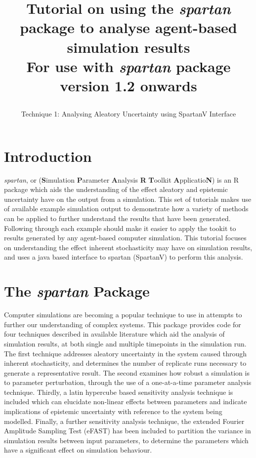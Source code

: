 \documentclass[a4paper,11pt]{article}
\title{\huge \textbf{Tutorial on using the \textit{spartan} package to analyse agent-based simulation results}\\
\Large For use with \textit{spartan} package version 1.2 onwards
\author{\Large Technique 1: Analysing Aleatory Uncertainty using SpartanV Interface}
\date{}
}
\begin{document}
\maketitle


\section{Introduction}
\noindent \textit{spartan}, or (\textbf{S}imulation \textbf{P}arameter \textbf{A}nalysis \textbf{R} \textbf{T}oolkit \textbf{A}pplicatio\textbf{N}) is an R package which aids the understanding of the effect aleatory and epistemic uncertainty have on the output from a simulation.  This set of tutorials makes use of available example simulation output to demonstrate how a variety of methods can be applied to further understand the results that have been generated.  Following through each example should make it easier to apply the tookit to results generated by any agent-based computer simulation.  This tutorial focuses on understanding the effect inherent stochasticity may have on simulation results, and uses a java based interface to spartan (SpartanV) to perform this analysis.

\section{The \textit{spartan} Package}
\noindent Computer simulations are becoming a popular technique to use in attempts to further our understanding of complex systems. This package provides code for four techniques described in available literature which aid the analysis of simulation results, at both single and multiple timepoints in the simulation run. The first technique addresses aleatory uncertainty in the system caused through inherent stochasticity, and determines the number of replicate runs necessary to generate a representative result. The second examines how robust a simulation is to parameter perturbation, through the use of a one-at-a-time parameter analysis technique. Thirdly, a latin hypercube based sensitivity analysis technique is included which can elucidate non-linear effects between parameters and indicate implications of epistemic uncertainty with reference to the system being modelled. Finally, a further sensitivity analysis technique, the extended Fourier Amplitude Sampling Test (eFAST) has been included to partition the variance in simulation results between input parameters, to determine the parameters which have a significant effect on simulation behaviour.
\end{document}
